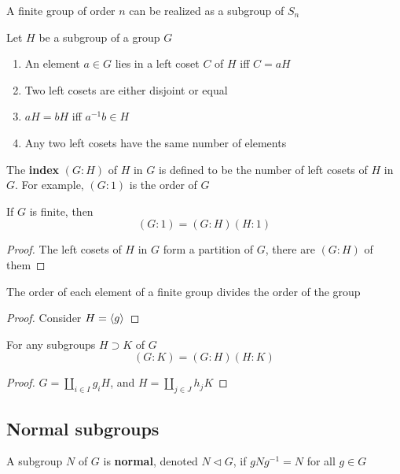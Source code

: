 \documentclass[11pt]{article}
\begin{document}
\begin{corollary}[]
A finite group of order \(n\) can be realized as a subgroup of \(S_n\)
\end{corollary}

\begin{proposition}[]
Let \(H\) be a subgroup of a group \(G\)
\begin{enumerate}
\item An element \(a\in G\)  lies in a left coset \(C\) of \(H\) iff \(C=aH\)
\item Two left cosets are either disjoint or equal
\item \(aH=bH\) iff \(a^{-1}b\in H\)
\item Any two left cosets have the same number of elements
\end{enumerate}
\end{proposition}

The \textbf{index} \((G:H)\) of \(H\) in \(G\) is defined to be the number of left cosets of \(H\)
in \(G\). For example, \((G:1)\) is the order of \(G\)

\begin{theorem}[Lagrange]
If \(G\) is finite, then
\begin{equation*}
(G:1)=(G:H)(H:1)
\end{equation*}
\end{theorem}

\begin{proof}
The left cosets of \(H\) in \(G\) form a partition of \(G\), there are \((G:H)\) of them
\end{proof}

\begin{corollary}[]
The order of each element of a finite group divides the order of the group
\end{corollary}

\begin{proof}
Consider \(H=\langle g\rangle\)
\end{proof}

\begin{proposition}[]
For any subgroups \(H\supset K\) of \(G\)
\begin{equation*}
(G:K)=(G:H)(H:K)
\end{equation*}
\end{proposition}

\begin{proof}
\(G=\coprod_{i\in I}g_iH\), and \(H=\coprod_{j\in J}h_jK\)
\end{proof}
\subsection{Normal subgroups}
\label{sec:orgb4dbb6d}
A subgroup \(N\) of \(G\) is \textbf{normal}, denoted \(N\lhd G\), if \(gNg^{-1}=N\) for all \(g\in G\)
\end{document}
